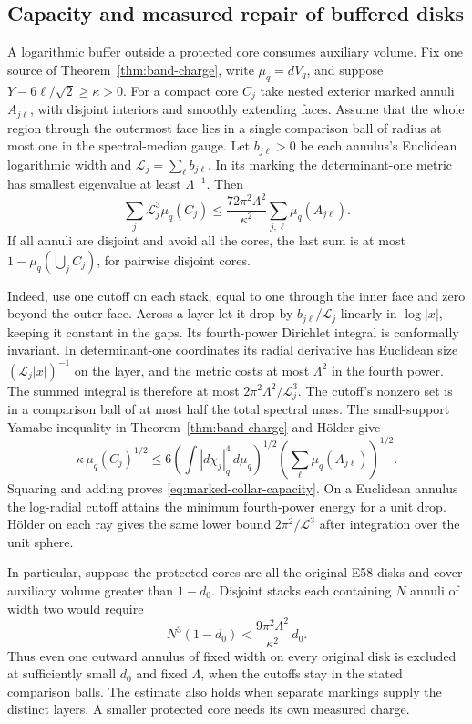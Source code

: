 \subsection{Capacity and measured repair of buffered disks}
\label{sec:collar-capacity}

A logarithmic buffer outside a protected core consumes auxiliary
volume. Fix one source of Theorem~\ref{thm:band-charge}, write
\(\mu_q=dV_q\), and suppose \(Y-6\ell/\sqrt{2}\ge\kappa>0\).
For a compact core \(C_j\) take nested exterior marked annuli
\(A_{j\ell}\), with disjoint interiors and smoothly extending faces.
Assume that the whole region through the outermost face lies in a
single comparison ball of radius at most one in the spectral-median
gauge. Let \(b_{j\ell}>0\) be each annulus's Euclidean logarithmic
width and \(\mathcal L_j=\sum_\ell b_{j\ell}\). In its marking the
determinant-one metric has smallest eigenvalue at least
\(\Lambda^{-1}\). Then
\begin{equation}\label{eq:marked-collar-capacity}
 \sum_j\mathcal L_j^3\mu_q(C_j)
 \le \frac{72\pi^2\Lambda^2}{\kappa^2}
          \sum_{j,\ell}\mu_q(A_{j\ell}).
\end{equation}
If all annuli are disjoint and avoid all the cores, the last sum
is at most \(1-\mu_q(\bigcup_j C_j)\), for pairwise disjoint cores.

Indeed, use one cutoff on each stack, equal to one through the inner
face and zero beyond the outer face. Across a layer let it drop by
\(b_{j\ell}/\mathcal L_j\) linearly in \(\log |x|\), keeping it constant
in the gaps. Its fourth-power Dirichlet integral is conformally
invariant. In determinant-one coordinates its radial derivative
has Euclidean size \((\mathcal L_j |x|)^{-1}\) on the layer, and
the metric costs at most \(\Lambda^2\) in the fourth power.
The summed integral is therefore at most
\(2\pi^2\Lambda^2/\mathcal L_j^3\). The cutoff's nonzero set is
in a comparison ball of at most half the total spectral mass.
The small-support Yamabe inequality in
Theorem~\ref{thm:band-charge} and H\"older give
\[
 \kappa\,\mu_q(C_j)^{1/2}
 \le 6\left(\int |d\chi_j|_q^4\,d\mu_q\right)^{1/2}
          \left(\sum_\ell\mu_q(A_{j\ell})\right)^{1/2}.
\]
Squaring and adding proves \eqref{eq:marked-collar-capacity}.
On a Euclidean annulus the log-radial cutoff attains the minimum
fourth-power energy for a unit drop. H\"older on each ray gives
the same lower bound \(2\pi^2/\mathcal L^3\) after integration over
the unit sphere.

In particular, suppose the protected cores are all the original E58
disks and cover auxiliary volume greater than \(1-d_0\). Disjoint
stacks each containing \(N\) annuli of width two would require
\[
 N^3(1-d_0)<\frac{9\pi^2\Lambda^2}{\kappa^2}\,d_0 .
\]
Thus even one outward annulus of fixed width on every original disk
is excluded at sufficiently small \(d_0\) and fixed \(\Lambda\),
when the cutoffs stay in the stated comparison balls. The estimate
also holds when separate markings supply the distinct layers.
A smaller protected core needs its own measured charge.

